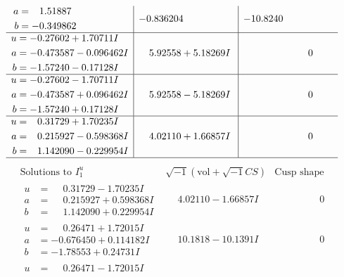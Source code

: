 \documentclass[1p]{elsarticle_modified}
\theoremstyle{definition}
\newcommand{\I}{\sqrt{-1}}
\begin{document}
$$\begin{array}{c|c|c}
\begin{aligned}
a &= \phantom{-}1.51887\phantom{ +0.000000I} \\
b &= -0.349862\phantom{ +0.000000I}\end{aligned}
 & -0.836204\phantom{ +0.000000I} & -10.8240\phantom{ +0.000000I} \\ \hline\begin{aligned}
u &= -0.27602 + 1.70711 I \\
a &= -0.473587 - 0.096462 I \\
b &= -1.57240 - 0.17128 I\end{aligned}
 & \phantom{-}5.92558 + 5.18269 I & \phantom{-0.000000 } 0 \\ \hline\begin{aligned}
u &= -0.27602 - 1.70711 I \\
a &= -0.473587 + 0.096462 I \\
b &= -1.57240 + 0.17128 I\end{aligned}
 & \phantom{-}5.92558 - 5.18269 I & \phantom{-0.000000 } 0 \\ \hline\begin{aligned}
u &= \phantom{-}0.31729 + 1.70235 I \\
a &= \phantom{-}0.215927 - 0.598368 I \\
b &= \phantom{-}1.142090 - 0.229954 I\end{aligned}
 & \phantom{-}4.02110 + 1.66857 I & \phantom{-0.000000 } 0\\
 \hline 
 \end{array}$$\newpage$$\begin{array}{c|c|c}  
\text{Solutions to }I^u_{1}& \I (\text{vol} + \sqrt{-1}CS) & \text{Cusp shape}\\
 \hline 
\begin{aligned}
u &= \phantom{-}0.31729 - 1.70235 I \\
a &= \phantom{-}0.215927 + 0.598368 I \\
b &= \phantom{-}1.142090 + 0.229954 I\end{aligned}
 & \phantom{-}4.02110 - 1.66857 I & \phantom{-0.000000 } 0 \\ \hline\begin{aligned}
u &= \phantom{-}0.26471 + 1.72015 I \\
a &= -0.676450 + 0.114182 I \\
b &= -1.78553 + 0.24731 I\end{aligned}
 & \phantom{-}10.1818 - 10.1391 I & \phantom{-0.000000 } 0 \\ \hline\begin{aligned}
u &= \phantom{-}0.26471 - 1.72015 I \\

\end{aligned}
\end{array}$$
\end{document}
